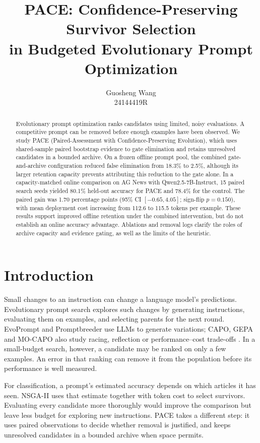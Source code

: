 \documentclass{article}
\title{PACE: Confidence-Preserving Survivor Selection\\in Budgeted Evolutionary Prompt Optimization}
\author{Guosheng Wang \\
24144419R}
\newcommand{\method}{\textsc{PACE}}
\begin{document}
\maketitle
\begin{abstract}
Evolutionary prompt optimization ranks candidates using limited, noisy evaluations.
A competitive prompt can be removed before enough examples have been observed.
We study \method{} (Paired-Assessment with Confidence-Preserving Evolution),
which uses shared-sample paired bootstrap evidence to gate elimination and retains
unresolved candidates in a bounded archive. On a frozen offline prompt pool,
the combined gate-and-archive configuration reduced false elimination from
18.3\% to 2.5\%, although its larger retention capacity prevents attributing this
reduction to the gate alone. In a capacity-matched online comparison on AG News
with Qwen2.5-7B-Instruct, 15 paired search seeds yielded 80.1\% held-out accuracy
for \method{} and 78.4\% for the control. The paired gain was 1.70 percentage
points (95\% CI $[-0.65,4.05]$; sign-flip $p=0.150$), with mean deployment
cost increasing from 112.6 to 115.5 tokens per example. These results support
improved offline retention under the combined intervention, but do not establish
an online accuracy advantage. Ablations and removal logs clarify the roles of
archive capacity and evidence gating, as well as the limits of the heuristic.
\end{abstract}

\section{Introduction}
Small changes to an instruction can change a language model's predictions.
Evolutionary prompt search explores such changes by generating instructions,
evaluating them on examples, and selecting parents for the next round.
EvoPrompt and Promptbreeder use LLMs to generate variations; CAPO, GEPA and
MO-CAPO also study racing, reflection or performance--cost trade-offs
\cite{evoprompt,promptbreeder,capo,gepa,mocapo}. In a small-budget search, however,
a candidate may be ranked on only a few examples. An error in that ranking can
remove it from the population before its performance is well measured.

For classification, a prompt's estimated accuracy depends on which articles it
has seen. NSGA-II uses that estimate together with token cost to select survivors.
Evaluating every candidate more thoroughly would improve the comparison but
leave less budget for exploring new instructions. PACE takes a different step:
it uses paired observations to decide whether removal is justified, and keeps
unresolved candidates in a bounded archive when space permits.
\end{document}
